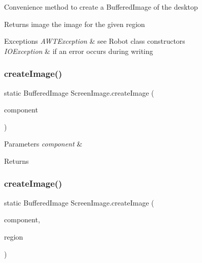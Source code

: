Convenience method to create a Buffered\+Image of the desktop

\begin{DoxyReturn}{Returns}
image the image for the given region 
\end{DoxyReturn}

\begin{DoxyExceptions}{Exceptions}
{\em A\+W\+T\+Exception} & see Robot class constructors \\
\hline
{\em I\+O\+Exception} & if an error occurs during writing \\
\hline
\end{DoxyExceptions}
\mbox{\label{class_screen_image_aaed2036a73612159556089a64a1176c9}} 
\subsubsection{create\+Image()\hspace{0.1cm}{\footnotesize\ttfamily [1/4]}}
{\footnotesize\ttfamily static Buffered\+Image Screen\+Image.\+create\+Image (\begin{DoxyParamCaption}\item[{J\+Component}]{component }\end{DoxyParamCaption})\hspace{0.3cm}{\ttfamily [static]}}


\begin{DoxyParams}{Parameters}
{\em component} & \\
\hline
\end{DoxyParams}
\begin{DoxyReturn}{Returns}

\end{DoxyReturn}
\mbox{\label{class_screen_image_a183a0c1a76eb4735c386e84afcf76a8b}} 
\subsubsection{create\+Image()\hspace{0.1cm}{\footnotesize\ttfamily [2/4]}}
{\footnotesize\ttfamily static Buffered\+Image Screen\+Image.\+create\+Image (\begin{DoxyParamCaption}\item[{J\+Component}]{component,  }\item[{Rectangle}]{region }\end{DoxyParamCaption})\hspace{0.3cm}{\ttfamily [static]}}


